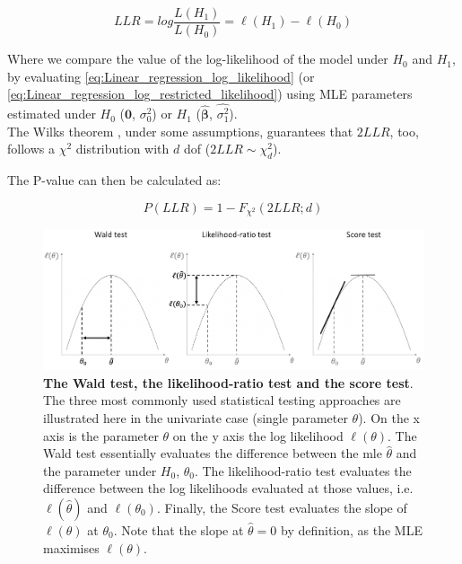 \begin{equation}\label{eq:log_likelihood_ratio}
LLR = log \frac{L(H_1)}{L(H_0)} = \ell(H_1) - \ell(H_0) 
\end{equation}

Where we compare the value of the log-likelihood of the model under $H_0$ and $H_1$, by evaluating \eqref{eq:Linear_regression_log_likelihood} (or \eqref{eq:Linear_regression_log_restricted_likelihood}) using MLE parameters estimated under $H_0$ ($\mathbf{0}$, $\sigma_0^2$) or $H_1$ ($\hat{\boldsymbol{\beta}}$, $\hat{\sigma_1^2}$).  \\

The Wilks theorem \cite{wilks1938large}, under some assumptions, guarantees that $2LLR$, too, follows a $\chi^2$ distribution with $d$ dof ($2LLR \sim \chi^2_d$).

The P-value can then be calculated as:

\begin{equation}\label{eq:lrt_p_value}
    P(LLR) = 1-F_{\chi^2}(2LLR; d)
\end{equation}


\begin{figure}[h]
\centering
\includegraphics[width=15cm]{Chapter2/Fig/wald_lrt_score_tests.png}
\caption[\textbf{Wald, LRT and score test}]{\textbf{The Wald test, the likelihood-ratio test and the score test}.\\
The three most commonly used statistical testing approaches are illustrated here in the univariate case (single parameter $\theta$). 
On the x axis is the parameter $\theta$ on the y axis the log likelihood $\ell(\theta)$.
The Wald test essentially evaluates the difference between the \gls{mle} $\hat{\theta}$ and the parameter under $H_0$, $\theta_0$.
The likelihood-ratio test evaluates the difference between the log likelihoods evaluated at those values, i.e. $\ell(\hat{\theta})$ and $\ell(\theta_0)$.
Finally, the Score test evaluates the slope of $\ell(\theta)$ at $\theta_0$. Note that the slope at $\hat{\theta}=0$ by definition, as the MLE maximises $\ell(\theta)$.}
\label{fig:hypothesis_tests}
\end{figure}

